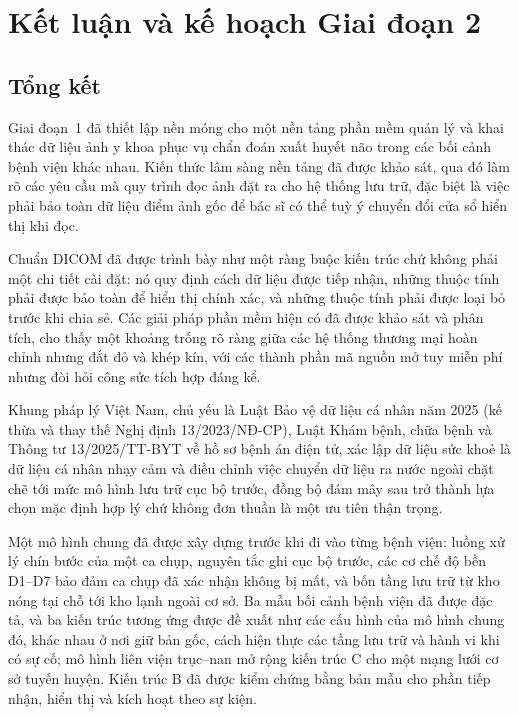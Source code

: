 \section{Kết luận và kế hoạch Giai đoạn 2}

\subsection{Tổng kết}

Giai đoạn~1 đã thiết lập nền móng cho một nền tảng phần mềm quản lý và khai thác
dữ liệu ảnh y khoa phục vụ chẩn đoán xuất huyết não trong các bối cảnh bệnh viện
khác nhau. Kiến thức lâm sàng nền tảng đã được khảo sát, qua đó làm rõ các yêu
cầu mà quy trình đọc ảnh đặt ra cho hệ thống lưu trữ, đặc biệt là việc phải bảo
toàn dữ liệu điểm ảnh gốc để bác sĩ có thể tuỳ ý chuyển đổi cửa sổ hiển thị khi
đọc.

Chuẩn DICOM đã được trình bày như một ràng buộc kiến trúc chứ không phải một chi
tiết cài đặt: nó quy định cách dữ liệu được tiếp nhận, những thuộc tính phải
được bảo toàn để hiển thị chính xác, và những thuộc tính phải được loại bỏ trước
khi chia sẻ. Các giải pháp phần mềm hiện có đã được khảo sát và phân tích, cho
thấy một khoảng trống rõ ràng giữa các hệ thống thương mại hoàn chỉnh nhưng đắt
đỏ và khép kín, với các thành phần mã nguồn mở tuy miễn phí nhưng đòi hỏi công
sức tích hợp đáng kể.

Khung pháp lý Việt Nam, chủ yếu là Luật Bảo vệ dữ liệu cá nhân năm 2025 (kế thừa
và thay thế Nghị định 13/2023/NĐ-CP), Luật Khám bệnh, chữa bệnh và Thông tư
13/2025/TT-BYT về hồ sơ bệnh án điện tử, xác lập dữ liệu sức khoẻ là dữ liệu cá nhân nhạy cảm và điều
chỉnh việc chuyển dữ liệu ra nước ngoài chặt chẽ tới mức mô hình lưu trữ cục bộ
trước, đồng bộ đám mây sau trở thành lựa chọn mặc định hợp lý chứ không đơn
thuần là một ưu tiên thận trọng.

Một mô hình chung đã được xây dựng trước khi đi vào từng bệnh viện: luồng xử lý
chín bước của một ca chụp, nguyên tắc ghi cục bộ trước, các cơ chế độ bền D1--D7
bảo đảm ca chụp đã xác nhận không bị mất, và bốn tầng lưu trữ từ kho nóng tại chỗ
tới kho lạnh ngoài cơ sở. Ba mẫu bối cảnh bệnh viện đã được đặc tả, và ba kiến trúc
tương ứng được đề xuất như các cấu hình của mô hình chung đó, khác nhau ở nơi giữ
bản gốc, cách hiện thực các tầng lưu trữ và hành vi khi có sự cố; mô hình liên viện
trục--nan mở rộng kiến trúc C cho một mạng lưới cơ sở tuyến huyện. Kiến trúc B đã
được kiểm chứng bằng bản mẫu cho phần tiếp nhận, hiển thị và kích hoạt theo sự kiện.

